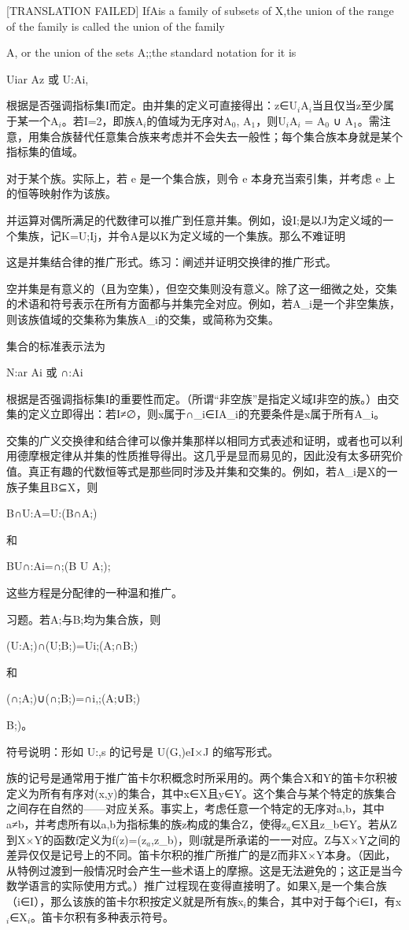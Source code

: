 \documentclass[12pt,a4paper]{ctexbook}
\theoremstyle{definition}
\theoremstyle{remark}
\begin{document}
[TRANSLATION FAILED] If{A}is a family of subsets of X,the union of the range of the family is called the union of the family {A, or the union of the sets A;;the standard notation for it is

Uiar Az 或 U:Ai,

根据是否强调指标集I而定。由并集的定义可直接得出：z∈U$_{i}$A$_{i}$当且仅当z至少属于某一个A$_{i}$。若I=2，即族{A$_{i}$}的值域为无序对{A$_{0}$, A$_{1}$}，则U$_{i}$A$_{i}$ = A$_{0}$ ∪ A$_{1}$。需注意，用集合族替代任意集合族来考虑并不会失去一般性；每个集合族本身就是某个指标集的值域。

对于某个族。实际上，若 e 是一个集合族，则令 e 本身充当索引集，并考虑 e 上的恒等映射作为该族。

并运算对偶所满足的代数律可以推广到任意并集。例如，设{I;}是以J为定义域的一个集族，记K=U;Ij，并令{A}是以K为定义域的一个集族。那么不难证明

这是并集结合律的推广形式。练习：阐述并证明交换律的推广形式。

空并集是有意义的（且为空集），但空交集则没有意义。除了这一细微之处，交集的术语和符号表示在所有方面都与并集完全对应。例如，若{A\_i}是一个非空集族，则该族值域的交集称为集族{A\_i}的交集，或简称为交集。

集合的标准表示法为

N:ar Ai 或 ∩:Ai

根据是否强调指标集I的重要性而定。（所谓“非空族”是指定义域I非空的族。）由交集的定义立即得出：若I≠∅，则x属于∩\_{i∈I}A\_i的充要条件是x属于所有A\_i。

交集的广义交换律和结合律可以像并集那样以相同方式表述和证明，或者也可以利用德摩根定律从并集的性质推导得出。这几乎是显而易见的，因此没有太多研究价值。真正有趣的代数恒等式是那些同时涉及并集和交集的。例如，若{A\_i}是X的一族子集且B⊆X，则

B∩U:A=U:(B∩A;)

和

BU∩:Ai=∩;(B U A;);

这些方程是分配律的一种温和推广。

习题。若{A;}与{B;}均为集合族，则

(U:A;)∩(U;B;)=Ui;(A;∩B;)

和

(∩;A;)∪(∩;B;)=∩i,;(A;∪B;)

B;)。

符号说明：形如 U:,s 的记号是 U(G,)eI×J 的缩写形式。

族的记号是通常用于推广笛卡尔积概念时所采用的。两个集合X和Y的笛卡尔积被定义为所有有序对(x,y)的集合，其中x∈X且y∈Y。这个集合与某个特定的族集合之间存在自然的——对应关系。事实上，考虑任意一个特定的无序对{a,b}，其中a≠b，并考虑所有以{a,b}为指标集的族z构成的集合Z，使得z$_{a}$∈X且z\_b∈Y。若从Z到X×Y的函数f定义为f(z)=(z$_{a}$,z\_b)，则f就是所承诺的一一对应。Z与X×Y之间的差异仅仅是记号上的不同。笛卡尔积的推广所推广的是Z而非X×Y本身。（因此，从特例过渡到一般情况时会产生一些术语上的摩擦。这是无法避免的；这正是当今数学语言的实际使用方式。）推广过程现在变得直接明了。如果{X$_{i}$}是一个集合族（i∈I），那么该族的笛卡尔积按定义就是所有族{x$_{i}$}的集合，其中对于每个i∈I，有x$_{i}$∈X$_{i}$。笛卡尔积有多种表示符号。

}
\end{document}
